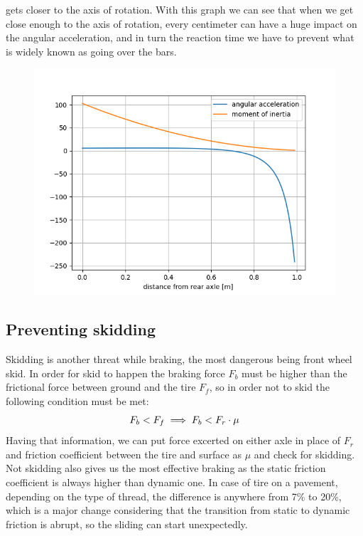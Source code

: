 \documentclass[12pt, a4]{article}
\begin{document}
gets closer to the axis of rotation. With this graph we can see that when we get close enough to the axis of 
rotation, every centimeter can have a huge impact on the angular acceleration, and in turn the reaction time 
we have to prevent what is widely known as going over the bars.
\begin{figure}[H]
\caption{}
\centering%
\label{fig:angular_acceleration_graph}
\includegraphics[width=0.8\linewidth]{angular_acceleration}%
\end{figure}
\subsection{Preventing skidding}\label{safe_braking_skidding}
Skidding is another threat while braking, the most dangerous being front wheel skid. In order for skid to happen
the braking force $F_b$ must be higher than the frictional force between ground and the tire $F_f$, so in order 
not to skid the following condition must be met:
\begin{equation}
\centering%
\label{eq:skidding}
F_b < F_f \implies F_b < F_r \cdot \mu
\end{equation}
Having that information, we can put force excerted on either axle in place of $F_r$ and friction coefficient
between the tire and surface as $\mu$ and check for skidding. 
Not skidding also gives us the most effective braking as the static friction coefficient is always higher than 
dynamic one. In case of tire on a pavement, depending on the type of thread, the difference is anywhere from
7\% to 20\%, which is a major change considering that the transition from static to dynamic friction is abrupt,
so the sliding can start unexpectedly.
\end{document}
